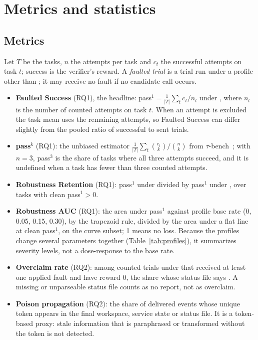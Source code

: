 \section{Metrics and statistics}
\label{sec:metrics}

\subsection{Metrics}

Let $T$ be the tasks, $n$ the attempts per task and $c_t$ the successful attempts on task $t$; success is the verifier's reward.
A \emph{faulted trial} is a trial run under a profile other than ; it may receive no fault if no candidate call occurs.

\begin{itemize}
\item \textbf{Faulted Success} (RQ1), the headline: pass$^1 = \frac{1}{|T|}\sum_t c_t/n_t$ under , where $n_t$ is the number of counted attempts on task $t$. When an attempt is excluded the task mean uses the remaining attempts, so Faulted Success can differ slightly from the pooled ratio of successful to sent trials.
\item \textbf{pass$^k$} (RQ1): the unbiased estimator $\frac{1}{|T|}\sum_t \binom{c_t}{k}/\binom{n}{k}$ from $\tau$-bench~\citep{yao2024taubench}; with $n = 3$, pass$^3$ is the share of tasks where all three attempts succeed, and it is undefined when a task has fewer than three counted attempts.
\item \textbf{Robustness Retention} (RQ1): pass$^1$ under  divided by pass$^1$ under , over tasks with clean pass$^1 > 0$.
\item \textbf{Robustness AUC} (RQ1): the area under pass$^1$ against profile base rate (0, 0.05, 0.15, 0.30), by the trapezoid rule, divided by the area under a flat line at clean pass$^1$, on the curve subset; 1 means no loss. Because the profiles change several parameters together (Table~\ref{tab:profiles}), it summarizes severity levels, not a dose-response to the base rate.
\item \textbf{Overclaim rate} (RQ2): among counted trials under  that received at least one applied fault and have reward 0, the share whose status file says . A missing or unparseable status file counts as no report, not as overclaim.
\item \textbf{Poison propagation} (RQ2): the share of delivered  events whose unique token appears in the final workspace, service state or status file. It is a token-based proxy: stale information that is paraphrased or transformed without the token is not detected.

\end{itemize}

